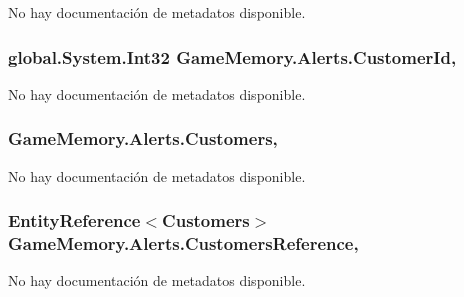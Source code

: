 No hay documentación de metadatos disponible. 

\hypertarget{class_game_memory_1_1_alerts_a65ef174df77f25f7e1725f53b38ba3a9}{
\subsubsection[{Customer\-Id}]{\setlength{\rightskip}{0pt plus 5cm}global.\-System.\-Int32 Game\-Memory.\-Alerts.\-Customer\-Id\hspace{0.3cm}{\ttfamily [get]}, {\ttfamily [set]}}}\label{class_game_memory_1_1_alerts_a65ef174df77f25f7e1725f53b38ba3a9}


No hay documentación de metadatos disponible. 

\hypertarget{class_game_memory_1_1_alerts_a95f4e83172bc78c6d100de58837b5949}{
\subsubsection[{Customers}]{ Game\-Memory.\-Alerts.\-Customers\hspace{0.3cm}{\ttfamily [get]}, {\ttfamily [set]}}}\label{class_game_memory_1_1_alerts_a95f4e83172bc78c6d100de58837b5949}


No hay documentación de metadatos disponible. 

\hypertarget{class_game_memory_1_1_alerts_a413ffe3f68f3c9e23cef4d542106fd97}{
\subsubsection[{Customers\-Reference}]{\setlength{\rightskip}{0pt plus 5cm}Entity\-Reference$<${\bf Customers}$>$ Game\-Memory.\-Alerts.\-Customers\-Reference\hspace{0.3cm}{\ttfamily [get]}, {\ttfamily [set]}}}\label{class_game_memory_1_1_alerts_a413ffe3f68f3c9e23cef4d542106fd97}


No hay documentación de metadatos disponible. 

